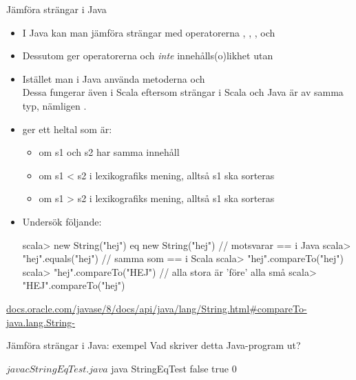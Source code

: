 \begin{Slide}{Jämföra strängar i Java}\SlideFontTiny
\begin{itemize}
\item I Java kan man  jämföra strängar med operatorerna \code{<}, \code{<=}, \code{>}, och \code{>=}

\item Dessutom ger operatorerna \code{==} och \code{!= } \emph{inte} innehålls(o)likhet utan  \code{:(}

\item Istället  man i Java använda metoderna  och  
\\Dessa fungerar även i Scala eftersom strängar i Scala och Java är av samma typ, nämligen .
\pause
\item {} ger ett heltal som är:
\begin{itemize}\SlideFontTiny
\item {} om s1 och s2 har samma innehåll
\item {} om s1 < s2 i lexikografiks mening, alltså s1 ska sorteras 
\item {} om s1 > s2 i lexikografiks mening, alltså s1 ska sorteras 
\end{itemize}

\pause
\item Undersök följande:
\begin{REPL}
scala> new String("hej") eq new String("hej") // motsvarar == i Java
scala> "hej".equals("hej")                    // samma som == i Scala
scala> "hej".compareTo("hej")
scala> "hej".compareTo("HEJ")         // alla stora är 'före' alla små
scala> "HEJ".compareTo("hej")
\end{REPL}
\end{itemize}

\href{http://docs.oracle.com/javase/8/docs/api/java/lang/String.html#compareTo-java.lang.String-}{docs.oracle.com/javase/8/docs/api/java/lang/String.html\#compareTo-java.lang.String-}
\end{Slide}


\begin{Slide}{Jämföra strängar i Java: exempel}\SlideFontSmall
Vad skriver detta Java-program ut?
\pause
\begin{REPL}
$ javac StringEqTest.java 
$ java StringEqTest 
false
true
0
\end{REPL}
\end{Slide}


\fi











